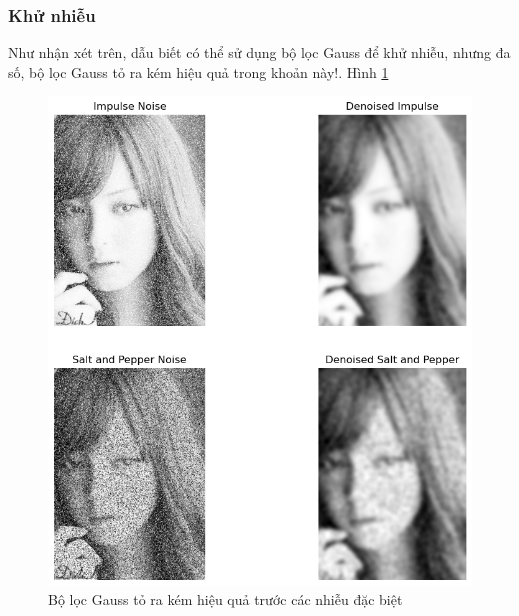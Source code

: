 \documentclass{article}
\begin{document}
    \subsubsection*{Khử nhiễu}
    Như nhận xét trên, dẫu biết có thể sử dụng bộ lọc Gauss để khử nhiễu, nhưng đa số, bộ lọc Gauss tỏ ra kém hiệu quả trong khoản này!. Hình \ref{fig10}
    \begin{figure}[ht!]
        \centering
        \includegraphics[width = 0.9\linewidth]{download (10).png}
        \caption{Bộ lọc Gauss tỏ ra kém hiệu quả trước các nhiễu đặc biệt}
        \label{fig10}
    \end{figure}  
\end{document}
